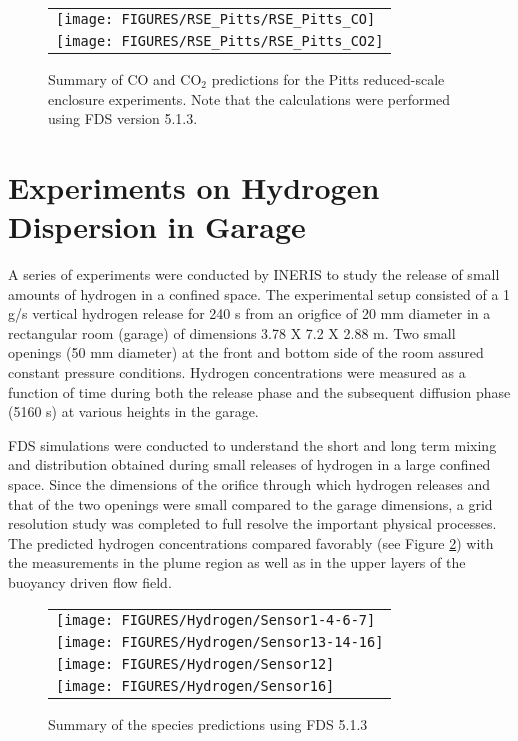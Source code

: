 \begin{figure}[p]
\begin{center}
\begin{tabular}{l}
\texttt{[image: FIGURES/RSE\_Pitts/RSE\_Pitts\_CO]} \\
\texttt{[image: FIGURES/RSE\_Pitts/RSE\_Pitts\_CO2]}
\end{tabular}
\end{center}
\caption[Summary of CO and CO$_2$ predictions, Pitts reduced-scale enclosure experiments.]
{Summary of CO and CO$_2$ predictions for the Pitts reduced-scale enclosure experiments. Note that the calculations were
performed using FDS version 5.1.3.}
\label{RSE_Pitts_Species}
\end{figure}

\clearpage

\section{Experiments on Hydrogen Dispersion in Garage}

A series of experiments were conducted by INERIS \cite{INERIS} to study the release of small amounts of hydrogen in 
a confined space. The experimental setup consisted of a 1 g/s vertical hydrogen release for 240 s from an origfice of 20 mm 
diameter in a rectangular room (garage) of dimensions 3.78 X 7.2 X 2.88 m. Two small openings (50 mm diameter) at the front
and bottom side of the room assured constant pressure conditions. Hydrogen concentrations were measured as a function of time 
during both the release phase and the subsequent diffusion phase (5160 s) at various heights in the garage. 

FDS simulations were conducted to understand the short and long term mixing and distribution obtained during small releases of 
hydrogen in a large confined space. Since the dimensions of the orifice through which hydrogen releases and that of the two 
openings were small compared to the garage dimensions, a grid resolution study was completed to full resolve the important physical 
processes. The predicted hydrogen concentrations compared favorably (see Figure \ref{Hydrogen_Species}) with the measurements in the plume region as well 
as in the upper layers of the buoyancy driven flow field.


\begin{figure}[p]
\begin{center}
\begin{tabular}{l}
\texttt{[image: FIGURES/Hydrogen/Sensor1-4-6-7]} \\
\texttt{[image: FIGURES/Hydrogen/Sensor13-14-16]} \\
\texttt{[image: FIGURES/Hydrogen/Sensor12]} \\
\texttt{[image: FIGURES/Hydrogen/Sensor16]} \\
\end{tabular}
\end{center}
\caption{Summary of the species predictions using FDS 5.1.3}
\label{Hydrogen_Species}
\end{figure}

